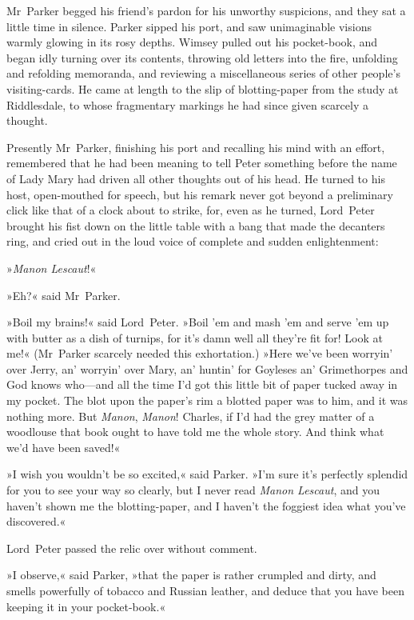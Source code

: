 Mr~Parker begged his friend's pardon for his unworthy suspicions, and they sat a little time in silence. Parker sipped his port, and saw unimaginable visions warmly glowing in its rosy depths. Wimsey pulled out his pocket-book, and began idly turning over its contents, throwing old letters into the fire, unfolding and refolding memoranda, and reviewing a miscellaneous series of other people's visiting-cards. He came at length to the slip of blotting-paper from the study at Riddlesdale, to whose fragmentary markings he had since given scarcely a thought.

Presently Mr~Parker, finishing his port and recalling his mind with an effort, remembered that he had been meaning to tell Peter something before the name of Lady Mary had driven all other thoughts out of his head. He turned to his host, open-mouthed for speech, but his remark never got beyond a preliminary click like that of a clock about to strike, for, even as he turned, Lord~Peter brought his fist down on the little table with a bang that made the decanters ring, and cried out in the loud voice of complete and sudden enlightenment:

»\textit{Manon Lescaut}!«

»Eh?« said Mr~Parker.

»Boil my brains!« said Lord~Peter. »Boil 'em and mash 'em and serve 'em up with butter as a dish of turnips, for it's damn well all they're fit for! Look at me!« (Mr~Parker scarcely needed this exhortation.) »Here we've been worryin' over Jerry, an' worryin' over Mary, an' huntin' for Goyleses an' Grimethorpes and God knows who—and all the time I'd got this little bit of paper tucked away in my pocket. The blot upon the paper's rim a blotted paper was to him, and it was nothing more. But \textit{Manon}, \textit{Manon}! Charles, if I'd had the grey matter of a woodlouse that book ought to have told me the whole story. And think what we'd have been saved!«

»I wish you wouldn't be so excited,« said Parker. »I'm sure it's perfectly splendid for you to see your way so clearly, but I never read \textit{Manon Lescaut}, and you haven't shown me the blotting-paper, and I haven't the foggiest idea what you've discovered.«

Lord~Peter passed the relic over without comment.

»I observe,« said Parker, »that the paper is rather crumpled and dirty, and smells powerfully of tobacco and Russian leather, and deduce that you have been keeping it in your pocket-book.«

